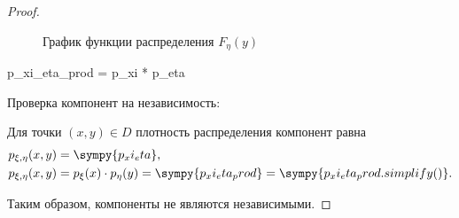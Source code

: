 \begin{proof}
    \begin{figure}[h!]
        \centering
        \caption{График функции распределения $F_\eta(y)$}
        \label{fig:F_eta}
    \end{figure}

    \begin{sympycode}
p_xi_eta_prod = p_xi * p_eta
  \end{sympycode}
    Проверка компонент на независимость:

    Для точки $(x, y) \in D$ плотность распределения компонент равна
    \[
        \begin{aligned}
            p_{\xi, \eta} (x, y) & = \sympy{p_xi_eta},                                                                          \\
            p_{\xi, \eta} (x, y) & = p_{\xi} (x) \cdot p_{\eta} (y) = \sympy{p_xi_eta_prod} = \sympy{p_xi_eta_prod.simplify()}.
        \end{aligned}
    \]

    Таким образом, компоненты не являются независимыми.

\end{proof}
